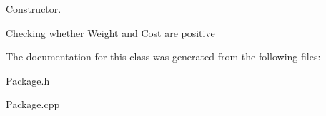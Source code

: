 Constructor. 

Checking whether Weight and Cost are positive 

The documentation for this class was generated from the following files\+:\begin{DoxyCompactItemize}
\item 
Package.\+h\item 
Package.\+cpp\end{DoxyCompactItemize}
